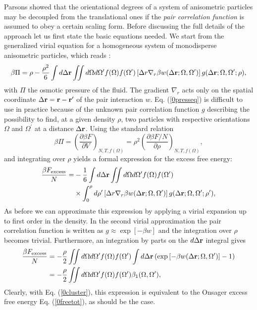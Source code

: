 \documentclass[amssymb]{revtex4}
\newcommand{\bfr}{{\bf r}}
\begin{document}
Parsons \cite{Parsons} 	showed that 
the orientational degrees of  a system of anisometric particles may 
be decoupled from the translational ones if  the  {\em pair
correlation function} is assumed to
obey a certain scaling form.
Before discussing the full details of the approach let us first state the basic  equations needed.
We start from the generalized virial  equation  for a homogeneous system of
monodisperse anisometric particles, which reads \cite{hansenmacdonald}:
\begin{equation}
\beta \Pi = \rho -\frac{\rho^{2}}{6}\int d\Delta\bfr \iint d\Omega d\Omega^{\prime}
f(\Omega)f(\Omega^{\prime}) \left[\Delta r \nabla_{r} \beta w(\Delta\bfr;\Omega,\Omega^{\prime})\right]
g(\Delta\bfr;\Omega,\Omega^{\prime};\rho), \label{0presseq}
\end{equation}
with $\Pi$ the osmotic pressure of the fluid. The gradient $\nabla_{r}$ acts only on the spatial coordinate $\Delta\bfr=\bfr-\bfr^{\prime}$
of the pair interaction $w$. 
Eq. (\ref{0presseq}) is difficult to use in practice because of the unknown
pair correlation function $g$ 
describing the possibility to find, at a given density $\rho$,
two particles with respective orientations $\Omega$ and $\Omega^{\prime}$ at a distance $\Delta\bfr$. 
Using the standard relation 
\begin{equation}
\beta\Pi=\left(\frac{\partial \beta F}{\partial V}\right)_{N,T,f(\Omega)}
=\rho^{2} \left(\frac{\partial \beta F/N}{\partial \rho}\right)_{N,T,f(\Omega)}, 
\end{equation} 
and integrating over $\rho$ yields a formal expression for the
excess free energy:
\begin{align}
\frac{\beta F_{\text{excess}}}{N}=&-\frac{1}{6}\int d\Delta\bfr \iint d\Omega d\Omega^{\prime}
f(\Omega)f(\Omega^{\prime}) \nonumber \\ 
&\times \int_{0}^{\rho}d\rho^{\prime} \left[\Delta r \nabla_{r} \beta w(\Delta\bfr;\Omega,\Omega^{\prime})\right]
g(\Delta\bfr;\Omega,\Omega^{\prime};\rho^{\prime}),   \label{0freeformal}
\end{align} 
As before we can approximate this expression by applying a virial expansion  
up to first order in the density. In the second virial approximation the pair correlation function 
is written as $g\approx \exp[-\beta w ]$ and the integration over $\rho$ becomes trivial.
Furthermore, an integration by parts on the $d\Delta\bfr$ integral gives
\begin{align}
\frac{\beta F_{\text{excess}}}{N}&=-\frac{\rho}{2} \iint d\Omega d\Omega^{\prime}
f(\Omega)f(\Omega^{\prime}) \int d\Delta\bfr \left(\exp\left[-\beta w(\Delta\bfr;\Omega,\Omega^{\prime})\right]
-1  \right) \nonumber \\
&=-\frac{\rho}{2}\iint d\Omega d\Omega^{\prime}
f(\Omega)f(\Omega^{\prime}) \beta_{1}(\Omega,\Omega^{\prime}),   
\end{align}
Clearly, with Eq. (\ref{0cluster}), this expression is equivalent to the Onsager
excess free energy Eq. (\ref{0freetot}), as should be the case. 
\end{document}
